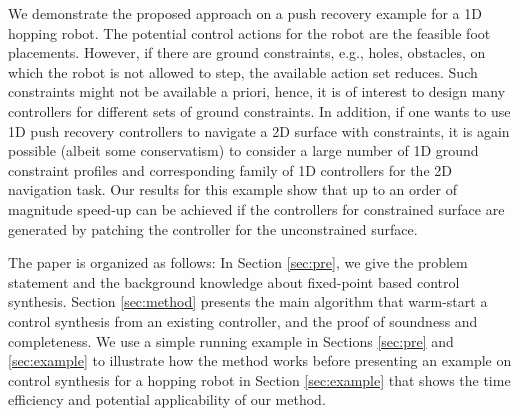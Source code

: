 







We demonstrate the proposed approach on a push recovery example for a 1D hopping robot. The potential control actions for the robot are the feasible foot placements. However, if there are ground constraints, e.g., holes, obstacles, on which the robot is not allowed to step, the available action set reduces. Such constraints might not be available a priori, hence, it is of interest to design many controllers for different sets of ground constraints. In addition, if one wants to use 1D push recovery controllers to navigate a 2D surface with constraints, it is again possible (albeit some conservatism) to consider a large number of 1D ground constraint profiles and corresponding family of 1D controllers for the 2D navigation task. Our results for this example show that up to an order of magnitude speed-up can be achieved if the controllers for constrained surface are generated by patching the controller for the unconstrained surface.  



The paper is organized as follows: In Section \ref{sec:pre}, we give the problem statement and the background knowledge about fixed-point based control synthesis. Section \ref{sec:method} presents the main algorithm that warm-start a control synthesis from an existing controller, and the proof of soundness and completeness. We use a simple running example in Sections \ref{sec:pre} and \ref{sec:example} to illustrate how the method works before presenting an example on control synthesis for a hopping robot in Section \ref{sec:example} that shows the time efficiency and potential applicability of our method.

